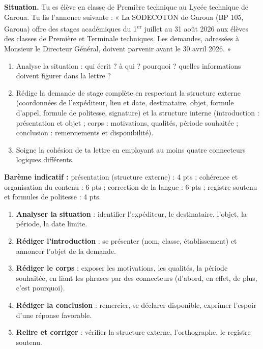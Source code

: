 \documentclass[11pt]{article}
\begin{document}
\begin{exercice}
\textbf{Situation.} Tu es élève en classe de Première technique au Lycée technique de Garoua. Tu lis l'annonce suivante : « La SODECOTON de Garoua (BP 105, Garoua) offre des stages académiques du 1\textsuperscript{er} juillet au 31 août 2026 aux élèves des classes de Première et Terminale techniques. Les demandes, adressées à Monsieur le Directeur Général, doivent parvenir avant le 30 avril 2026. »
\begin{enumerate}
\item Analyse la situation : qui écrit ? à qui ? pourquoi ? quelles informations doivent figurer dans la lettre ?
\item Rédige la demande de stage complète en respectant la structure externe (coordonnées de l'expéditeur, lieu et date, destinataire, objet, formule d'appel, formule de politesse, signature) et la structure interne (introduction : présentation et objet ; corps : motivations, qualités, période souhaitée ; conclusion : remerciements et disponibilité).
\item Soigne la cohésion de ta lettre en employant au moins quatre connecteurs logiques différents.
\end{enumerate}
\textbf{Barème indicatif :} présentation (structure externe) : 4 pts ; cohérence et organisation du contenu : 6 pts ; correction de la langue : 6 pts ; registre soutenu et formules de politesse : 4 pts.
\end{exercice}

\begin{methode}
\begin{enumerate}
\item \textbf{Analyser la situation} : identifier l'expéditeur, le destinataire, l'objet, la période, la date limite.
\item \textbf{Rédiger l'introduction} : se présenter (nom, classe, établissement) et annoncer l'objet de la demande.
\item \textbf{Rédiger le corps} : exposer les motivations, les qualités, la période souhaitée, en liant les phrases par des connecteurs (d'abord, en effet, de plus, c'est pourquoi).
\item \textbf{Rédiger la conclusion} : remercier, se déclarer disponible, exprimer l'espoir d'une réponse favorable.
\item \textbf{Relire et corriger} : vérifier la structure externe, l'orthographe, le registre soutenu.
\end{enumerate}
\end{methode}
\end{document}
